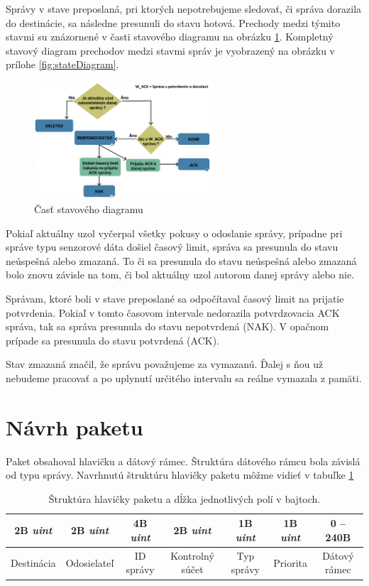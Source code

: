 \documentclass[slovak,master]{diploma}
\begin{document}
Správy v stave preposlaná, pri ktorých nepotrebujeme sledovať, či správa dorazila do destinácie, sa následne presunuli do stavu hotová. Prechody medzi týmito stavmi 
su znázornené v časti stavového diagramu na obrázku \ref{fig:stateFlowMin}. Kompletný stavový diagram prechodov medzi stavmi správ je vyobrazený na obrázku v prílohe \ref{fig:stateDiagram}.

\begin{figure}[h!]
	\centering
	\includegraphics[width=0.6\textwidth]{Figures/state_flow_Min.png}
	\caption{Časť stavového diagramu}
	\label{fig:stateFlowMin}
\end{figure}

Pokiaľ aktuálny uzol vyčerpal všetky pokusy o odoslanie správy, prípadne pri správe typu senzorové dáta došiel časový limit, správa sa presunula do stavu neúspešná alebo zmazaná.
To či sa presunula do stavu neúspešná alebo zmazaná bolo znovu závisle na tom, či bol aktuálny uzol autorom danej správy alebo nie.

Správam, ktoré boli v stave preposlané sa odpočítaval časový limit na prijatie potvrdenia. Pokiaľ v tomto časovom intervale nedorazila potvrdzovacia ACK správa, tak sa 
správa presunula do stavu nepotvrdená (NAK). V opačnom prípade sa presunula do stavu potvrdená (ACK).

Stav zmazaná značil, že správu považujeme za vymazanú. Ďalej s ňou už nebudeme pracovať a po uplynutí určitého intervalu sa reálne vymazala z pamäti.


\section{Návrh paketu}
Paket obsahoval hlavičku a dátový rámec. Štruktúra dátového rámcu bola závislá od typu správy.
Navrhnutú štruktúru hlavičky paketu môžme vidieť v tabuľke \ref{tab:packetHeader}

\begin{table}[!h]
	\centering
  \caption{Štruktúra hlavičky paketu a dĺžka jednotlivých polí v bajtoch.}
  \begin{tabular}{|c|c|c|c|c|c|c|}
    \toprule
    2B \emph{uint} & 2B \emph{uint} & 4B \emph{uint} & 2B \emph{uint} & 1B \emph{uint} & 1B \emph{uint} & 0 -- 240B \\
    \midrule
    Destinácia & Odosielateľ & ID správy & Kontrolný súčet & Typ správy & Priorita & Dátový rámec \\
    \midrule
  \end{tabular}
  \label{tab:packetHeader}
\end{table}
\end{document}
